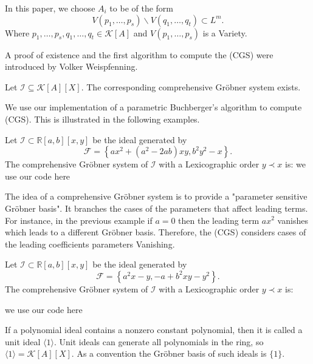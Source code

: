 \documentclass[runningheads]{llncs}
\newcommand{\Rr}{\mathbb{R}}
\newcommand{\1}{\chi}
\newcommand{\Ff}{\mathcal{F}}
\newcommand{\Ii}{\mathcal{I}}
\begin{document}
In this paper, we choose $A_i$ to be of the form 
$$V(p_1,\dots,p_s)\backslash V(q_1,\dots,q_t) \subset L^m.$$
Where $p_1,\dots,p_s,q_1,\dots,q_t\in \mathcal{K}[A]$ and $V(p_1,\dots,p_s)$ is a Variety.

A proof of existence and the first algorithm to compute the (CGS) were introduced by Volker Weispfenning.
\begin{theorem}
    Let $\mathcal{I}\subseteq\mathcal{K}[A][X].$ The corresponding comprehensive Gr{\"o}bner system exists.\cite{weispfenning}
\end{theorem}
We use our implementation of a parametric Buchberger's algorithm to compute (CGS). 
This is illustrated in the following examples.
\begin{example}
    Let $\Ii\subset \Rr[a,b][x,y]$ be the ideal generated by 
    $$\Ff=\left\{a x^2+\left(a^2-2 a b\right) x y, b^2 y^2-x\right\}.$$
    The comprehensive Gr{\"o}bner system of $\Ii$ with a Lexicographic order $y\prec x$ is:
    {\color{red} we use our code here}
\end{example}
The idea of a comprehensive Gr{\"o}bner system is to provide a "parameter sensitive Gr{\"o}bner basis".
It branches the cases of the parameters that affect leading terms. For instance, in the previous
example if $a=0$ then the leading term $a x^2$ vanishes which leads to a different Gr{\"o}bner basis. Therefore,
the (CGS) considers cases of the leading coefficients parameters Vanishing.

\begin{example}
    Let $\mathcal{I}\subset \Rr[a,b][x,y]$ be the ideal generated by 
    $$\Ff=\left\{a^2 x-y,-a+b^2 x
    y-y^2\right\}.$$
    The comprehensive Gr{\"o}bner system of $\mathcal{I}$ with a Lexicographic order $y\prec x$ is:
    
    {\color{red} we use our code here}
\end{example}

\begin{remark}
    If a polynomial ideal contains a nonzero constant polynomial, then it is called a unit ideal $\langle 1\rangle$.
   Unit ideals can generate all polynomials in the ring, so $\langle 1\rangle=\mathcal{K}[A][X]$.
    As a convention the Gr{\"o}bner basis of such ideals is $\{1\}$.
\end{remark}
   
\end{document}
